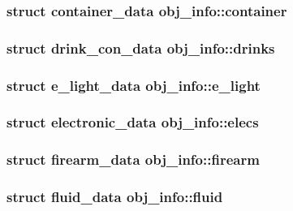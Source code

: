 \hypertarget{unionobj__info_a9a6d0a0e2aeb4aa82fab9aeee341d0da}{
\subsubsection[{container}]{\setlength{\rightskip}{0pt plus 5cm}struct {\bf container\-\_\-data} obj\-\_\-info\-::container}}\label{unionobj__info_a9a6d0a0e2aeb4aa82fab9aeee341d0da}
\hypertarget{unionobj__info_ab9dc892b3698f9c8d58e580d9169bebb}{
\subsubsection[{drinks}]{\setlength{\rightskip}{0pt plus 5cm}struct {\bf drink\-\_\-con\-\_\-data} obj\-\_\-info\-::drinks}}\label{unionobj__info_ab9dc892b3698f9c8d58e580d9169bebb}
\hypertarget{unionobj__info_a1663a28a9ef4f0c9f82be5be72fa39a7}{
\subsubsection[{e\-\_\-light}]{\setlength{\rightskip}{0pt plus 5cm}struct {\bf e\-\_\-light\-\_\-data} obj\-\_\-info\-::e\-\_\-light}}\label{unionobj__info_a1663a28a9ef4f0c9f82be5be72fa39a7}
\hypertarget{unionobj__info_a33226a98e933ef6ce4575cc79ef471a3}{
\subsubsection[{elecs}]{\setlength{\rightskip}{0pt plus 5cm}struct {\bf electronic\-\_\-data} obj\-\_\-info\-::elecs}}\label{unionobj__info_a33226a98e933ef6ce4575cc79ef471a3}
\hypertarget{unionobj__info_a5da8ed829db1d77e1e69aad0bc84e7fc}{
\subsubsection[{firearm}]{\setlength{\rightskip}{0pt plus 5cm}struct {\bf firearm\-\_\-data} obj\-\_\-info\-::firearm}}\label{unionobj__info_a5da8ed829db1d77e1e69aad0bc84e7fc}
\hypertarget{unionobj__info_a1e3b2278b83873c4aef4f8480176a110}{
\subsubsection[{fluid}]{\setlength{\rightskip}{0pt plus 5cm}struct {\bf fluid\-\_\-data} obj\-\_\-info\-::fluid}}\label{unionobj__info_a1e3b2278b83873c4aef4f8480176a110}
